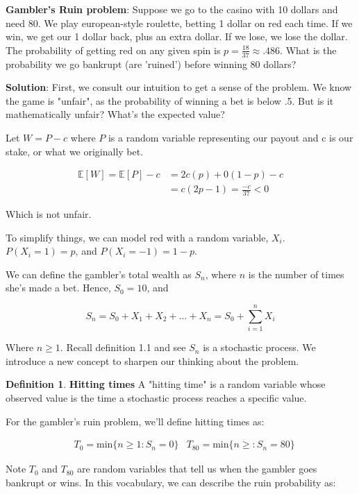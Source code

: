 \documentclass[12pt]{article}
\theoremstyle{definition}
\newtheorem{definition}{Definition}[section]
\begin{document}
\textbf{Gambler's Ruin problem}: Suppose we go to the casino with 10 dollars and need 80. We play european-style roulette, betting 1 dollar on red each time. If we win, we get our 1 dollar back, plus an extra dollar. If we lose, we lose the dollar. The probability of getting red on any given spin is $p = \frac{18}{37} \approx .486$. What is the probability we go bankrupt (are 'ruined') before winning 80 dollars?

\textbf{Solution}: First, we consult our intuition to get a sense of the problem. We know the game is "unfair", as the probability of winning a bet is below .5. But is it mathematically unfair? What's the expected value?

Let $W = P -c$ where $P$ is a random variable representing our payout and c is our stake, or what we originally bet.

\begin{align*}
  \mathbb{E}[W] = \mathbb{E}[P] - c &= 2c(p) + 0(1-p) -c \\
   &= c(2p -1)  = \frac{-c}{37} < 0
\end{align*}

Which is not unfair.

To simplify things, we can model red with a random variable, $X_i$. $P(X_i =1) = p$, and $P(X_i = -1) = 1-p$.

We can define the gambler's total wealth as $S_n$, where $n$ is the number of times she's made a bet. Hence, $S_0 = 10$, and

$$
S_n = S_0 + X_1 + X_2 +\dots + X_n = S_0 + \sum_{i=1}^n X_i
$$

Where $n \geq 1$. Recall definition 1.1 and see $S_n$ is a stochastic process. We introduce a new concept to sharpen our thinking about the problem.


\begin{definition}{\textbf{Hitting times}}
A "hitting time" is a random variable whose observed value is the time a stochastic process reaches a specific value.

For the gambler's ruin problem, we'll define hitting times as:

\begin{align*}
  &T_0 = \text{min}\{n \geq 1: S_n = 0\} &T_{80} = \text{min}\{ n \geq: S_n = 80\}
\end{align*}

\end{definition}

Note $T_0$ and $T_{80}$ are random variables that tell us when the gambler goes bankrupt or wins. In this vocabulary, we can describe the ruin probability as:
\end{document}
